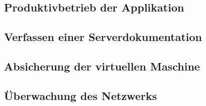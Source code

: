 \documentclass[
]{article}
\begin{document}
\hypertarget{produktivbetrieb-der-applikation}{%
\subsection{Produktivbetrieb der
Applikation}\label{produktivbetrieb-der-applikation}}

\hypertarget{verfassen-einer-serverdokumentation}{%
\subsection{Verfassen einer
Serverdokumentation}\label{verfassen-einer-serverdokumentation}}

\hypertarget{absicherung-der-virtuellen-maschine}{%
\subsection{Absicherung der virtuellen
Maschine}\label{absicherung-der-virtuellen-maschine}}

\hypertarget{uxfcberwachung-des-netzwerks}{%
\subsection{Überwachung des
Netzwerks}\label{uxfcberwachung-des-netzwerks}}
\end{document}
